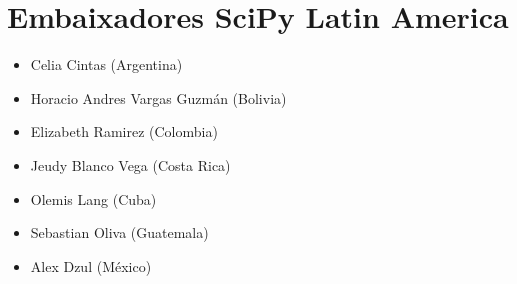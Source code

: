 \documentclass[a4paper,twocolumn,openright,article,12pt]{memoir}
\begin{document}
\section*{Embaixadores SciPy Latin America}

\begin{itemize}
\item Celia Cintas (Argentina)
\item Horacio Andres Vargas Guzmán (Bolivia)
\item Elizabeth Ramirez (Colombia)
\item Jeudy Blanco Vega (Costa Rica)
\item Olemis Lang (Cuba)
\item Sebastian Oliva (Guatemala)
\item Alex Dzul (México)
\end{itemize}
\end{document}

